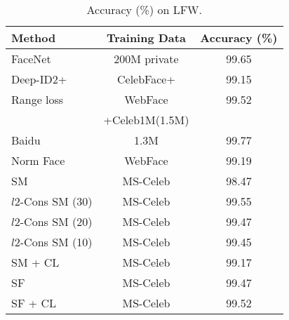 \documentclass[10pt,twocolumn,letterpaper]{article}
\begin{document}
\begin{table}%
\small
\caption{Accuracy (\%) on LFW. } %
\centering %
\begin{tabular}{l c c } %

\hline\hline %


Method & Training Data   & Accuracy (\%)   \\
\hline %
FaceNet \cite{schroff2015facenet}  & 200M private  & 99.65   \\ %
Deep-ID2+  \cite{sun2014deep}  &  CelebFace+	& 99.15  \\
Range loss \cite{ZhangFWL016}  &  WebFace &  99.52 \\
  &  +Celeb1M(1.5M) &  \\
Baidu \cite{liu2015targeting}  &  1.3M &  99.77 \\


Norm Face \cite{Wang2017NormFace} & WebFace  &   99.19 \\

\hline
\hline

SM    &   MS-Celeb     &   98.47  \\
$l2$-Cons SM (30) \cite{ranjan2017l2}   &   MS-Celeb     &   99.55  \\ 
$l2$-Cons SM (20) \cite{ranjan2017l2}   &   MS-Celeb     &   99.47  \\ 
$l2$-Cons SM (10) \cite{ranjan2017l2}   &   MS-Celeb     &   99.45  \\ 
SM + CL \cite{wen2016discriminative}   &  MS-Celeb     &     99.17   \\ 
SF   \cite{liu2017sphereface}   &   MS-Celeb     &   99.47   \\
SF + CL \cite{wen2016discriminative, liu2017sphereface}  &  MS-Celeb     &   99.52   \\



\end{tabular}
\end{table}
\end{document}
